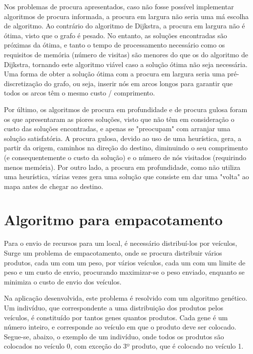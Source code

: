 \documentclass[12pt, a4paper, titlepage]{article}
\begin{document}
Nos problemas de procura apresentados, caso não fosse possível implementar algoritmos de procura
informada, a procura em largura não seria uma má escolha de algoritmo. Ao contrário do algoritmo de
Dijkstra, a procura em largura não é ótima, visto que o grafo é pesado. No entanto, as soluções
encontradas são próximas da ótima, e tanto o tempo de processamento necessário como os requisitos de
memória (número de visitas) são menores do que os do algoritmo de Dijkstra, tornando este algoritmo
viável caso a solução ótima não seja necessária. Uma forma de obter a solução ótima com a procura em
largura seria uma pré-discretização do grafo, ou seja, inserir nós em arcos longos para garantir que
todos os arcos têm o mesmo custo / comprimento.

Por último, os algoritmos de procura em profundidade e de procura gulosa foram os que apresentaram
as piores soluções, visto que não têm em consideração o custo das soluções encontradas, e apenas se
"preocupam"{} com arranjar uma solução satisfatória. A procura gulosa, devido ao uso de uma
heurística, gera, a partir da origem, caminhos na direção do destino, diminuindo o seu comprimento
(e consequentemente o custo da solução) e o número de nós visitados (requirindo menos memória). Por
outro lado, a procura em profundidade, como não utiliza uma heurística, várias vezes gera uma
solução que consiste em dar uma "volta"{} ao mapa antes de chegar ao destino.

\section{Algoritmo para empacotamento}

Para o envio de recursos para um local, é necessário distribuí-los por veículos, Surge um problema
de empacotamento, onde se procura distribuir vários produtos, cada um com um peso, por vários
veículos, cada um com um limite de peso e um custo de envio, procurando maximizar-se o peso enviado,
enquanto se minimiza o custo de envio dos veículos.

Na aplicação desenvolvida, este problema é resolvido com um algoritmo genético. Um indivíduo, que
correspondente a uma distribuição dos produtos pelos veículos, é constituído por tantos genes
quantos produtos. Cada gene é um número inteiro, e corresponde ao veículo em que o produto deve ser
colocado. Segue-se, abaixo, o exemplo de um indivíduo, onde todos os produtos são colocados no
veículo 0, com exceção do 3º produto, que é colocado no veículo 1.
\end{document}
